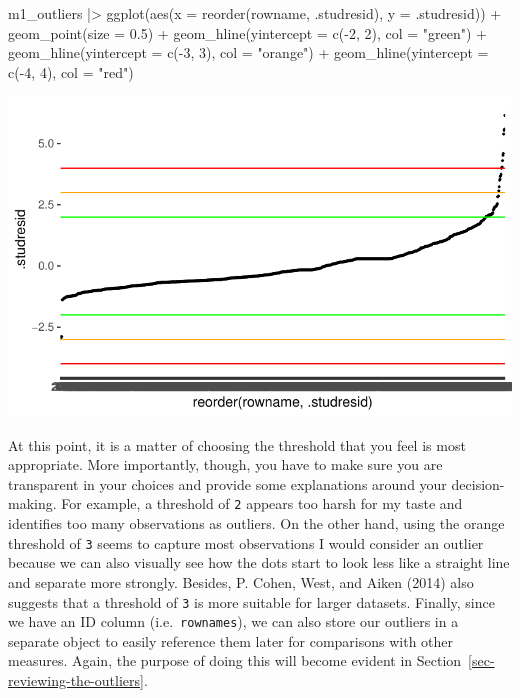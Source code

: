 \documentclass[
  letterpaper,
]{krantz}
\makeatletter
\newenvironment{Shaded}{\begin{snugshade}}{\end{snugshade}}
\newcommand{\AttributeTok}[1]{\textcolor[rgb]{0.40,0.45,0.13}{#1}}
\newcommand{\DecValTok}[1]{\textcolor[rgb]{0.68,0.00,0.00}{#1}}
\newcommand{\FloatTok}[1]{\textcolor[rgb]{0.68,0.00,0.00}{#1}}
\newcommand{\FunctionTok}[1]{\textcolor[rgb]{0.28,0.35,0.67}{#1}}
\newcommand{\NormalTok}[1]{\textcolor[rgb]{0.00,0.23,0.31}{#1}}
\newcommand{\SpecialCharTok}[1]{\textcolor[rgb]{0.37,0.37,0.37}{#1}}
\newcommand{\StringTok}[1]{\textcolor[rgb]{0.13,0.47,0.30}{#1}}
\newenvironment{kframe}{%
\medskip{}
\setlength{\fboxsep}{.8em}
 \def\at@end@of@kframe{}%
 \ifinner\ifhmode%
  \def\at@end@of@kframe{\end{minipage}}%
  \begin{minipage}{\columnwidth}%
 \fi\fi%
 \def\FrameCommand##1{\hskip\@totalleftmargin \hskip-\fboxsep
 \colorbox{shadecolor}{##1}\hskip-\fboxsep
     \hskip-\linewidth \hskip-\@totalleftmargin \hskip\columnwidth}%
 \MakeFramed {\advance\hsize-\width
   \@totalleftmargin\z@ \linewidth\hsize
   \@setminipage}}%
 {\par\unskip\endMakeFramed%
 \at@end@of@kframe}
\renewenvironment{Shaded}{\begin{kframe}}{\end{kframe}}
\makeatother
\begin{document}
\begin{Shaded}
\begin{Highlighting}[]
\NormalTok{m1\_outliers }\SpecialCharTok{|\textgreater{}}
  \FunctionTok{ggplot}\NormalTok{(}\FunctionTok{aes}\NormalTok{(}\AttributeTok{x =} \FunctionTok{reorder}\NormalTok{(rowname, .studresid),}
             \AttributeTok{y =}\NormalTok{ .studresid)) }\SpecialCharTok{+}
  \FunctionTok{geom\_point}\NormalTok{(}\AttributeTok{size =} \FloatTok{0.5}\NormalTok{) }\SpecialCharTok{+}
  \FunctionTok{geom\_hline}\NormalTok{(}\AttributeTok{yintercept =} \FunctionTok{c}\NormalTok{(}\SpecialCharTok{{-}}\DecValTok{2}\NormalTok{, }\DecValTok{2}\NormalTok{), }\AttributeTok{col =} \StringTok{"green"}\NormalTok{) }\SpecialCharTok{+}
  \FunctionTok{geom\_hline}\NormalTok{(}\AttributeTok{yintercept =} \FunctionTok{c}\NormalTok{(}\SpecialCharTok{{-}}\DecValTok{3}\NormalTok{, }\DecValTok{3}\NormalTok{), }\AttributeTok{col =} \StringTok{"orange"}\NormalTok{) }\SpecialCharTok{+}
    \FunctionTok{geom\_hline}\NormalTok{(}\AttributeTok{yintercept =} \FunctionTok{c}\NormalTok{(}\SpecialCharTok{{-}}\DecValTok{4}\NormalTok{, }\DecValTok{4}\NormalTok{), }\AttributeTok{col =} \StringTok{"red"}\NormalTok{)}
\end{Highlighting}
\end{Shaded}

\includegraphics{13_regressions_files/figure-pdf/plot-outliers-ext-stud-resid-1.pdf}

At this point, it is a matter of choosing the threshold that you feel is
most appropriate. More importantly, though, you have to make sure you
are transparent in your choices and provide some explanations around
your decision-making. For example, a threshold of \texttt{2} appears too
harsh for my taste and identifies too many observations as outliers. On
the other hand, using the orange threshold of \texttt{3} seems to
capture most observations I would consider an outlier because we can
also visually see how the dots start to look less like a straight line
and separate more strongly. Besides, P. Cohen, West, and Aiken (2014)
also suggests that a threshold of \texttt{3} is more suitable for larger
datasets. Finally, since we have an ID column (i.e.~\texttt{rownames}),
we can also store our outliers in a separate object to easily reference
them later for comparisons with other measures. Again, the purpose of
doing this will become evident in
Section~\ref{sec-reviewing-the-outliers}.
\end{document}
